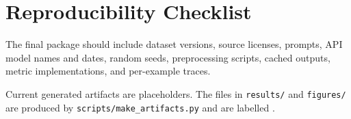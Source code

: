 \section{Reproducibility Checklist}
The final package should include dataset versions, source licenses, prompts, API model names and dates, random seeds, preprocessing scripts, cached outputs, metric implementations, and per-example traces.

Current generated artifacts are placeholders. The files in \texttt{results/} and \texttt{figures/} are produced by \texttt{scripts/make\_artifacts.py} and are labelled \syntheticlabel{}.
